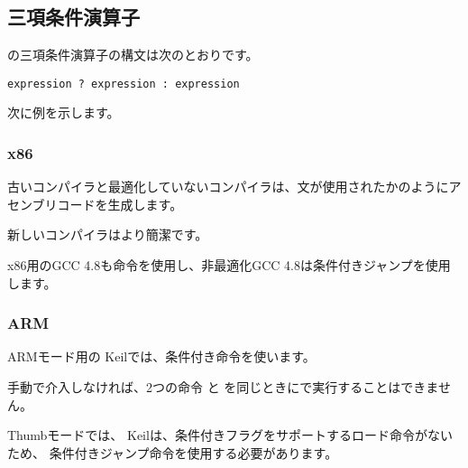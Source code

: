 \subsection{三項条件演算子}
\label{chap:cond}

\CCpp の三項条件演算子の構文は次のとおりです。

\begin{lstlisting}
expression ? expression : expression
\end{lstlisting}

次に例を示します。



\subsubsection{x86}

古いコンパイラと最適化していないコンパイラは、文が使用されたかのようにアセンブリコードを生成します。





新しいコンパイラはより簡潔です。



x86用の\Optimizing GCC 4.8も命令を使用し、非最適化GCC 4.8は条件付きジャンプを使用します。

\subsubsection{ARM}

ARMモード用の \Optimizing Keilでは、条件付き命令を使います。



手動で介入しなければ、2つの命令 と を同じときにで実行することはできません。

Thumbモードでは、 \Optimizing Keilは、条件付きフラグをサポートするロード命令がないため、
条件付きジャンプ命令を使用する必要があります。

